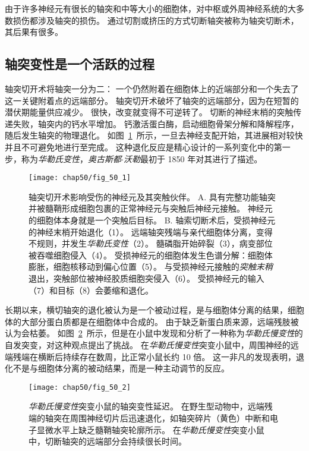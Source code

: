 由于许多神经元有很长的轴突和中等大小的细胞体，对中枢或外周神经系统的大多数损伤都涉及轴突的损伤。
通过切割或挤压的方式切断轴突被称为轴突切断术，其后果有很多。

\subsection{轴突变性是一个活跃的过程}

轴突切开术将轴突一分为二：
一个仍然附着在细胞体上的近端部分和一个失去了这一关键附着点的远端部分。
轴突切开术破坏了轴突的远端部分，因为在短暂的潜伏期能量供应减少。
很快，改变就变得不可逆转了。
切断的神经末梢的突触传递失败，轴突内的钙水平增加。
钙激活蛋白酶，启动细胞骨架分解和降解程序，随后发生轴突的物理退化。
如图~\ref{fig:50_1}~所示，一旦去神经支配开始，其进展相对较快并且不可避免地进行至完成。
这种退化反应是精心设计的一系列变化中的第一步，称为\textit{华勒氏变性}，\textit{奥古斯都$\cdot$沃勒}最初于 1850 年对其进行了描述。


\begin{figure}[htbp]
	\centering
	\texttt{[image: chap50/fig\_50\_1]}
	\caption{轴突切开术影响受伤的神经元及其突触伙伴。
		A. 具有完整功能轴突并被髓鞘形成细胞包裹的正常神经元与突触后神经元接触。
		神经元的细胞体本身就是一个突触后目标。
		B. 轴索切断术后，受损神经元的神经末梢开始退化（1）。
		远端轴突残端与亲代细胞体分离，变得不规则，并发生\textit{华勒氏变性}（2）。
		髓磷脂开始碎裂（3），病变部位被吞噬细胞侵入（4）。
		受损神经元的细胞体发生色谱分解：细胞体膨胀，细胞核移动到偏心位置（5）。
		与受损神经元接触的\textit{突触末稍}退出，突触部位被神经胶质细胞突侵入（6）。
		受损神经元的输入（7）和目标（8）会萎缩和退化。}
	\label{fig:50_1}
\end{figure}


长期以来，横切轴突的退化被认为是一个被动过程，是与细胞体分离的结果，细胞体的大部分蛋白质都是在细胞体中合成的。
由于缺乏新蛋白质来源，远端残肢被认为会枯萎。
如图~\ref{fig:50_2}~所示，但是在小鼠中发现和分析了一种称为\textit{华勒氏慢变性}的自发突变，对这种观点提出了挑战。 
在\textit{华勒氏慢变性}突变小鼠中，周围神经的远端残端在横断后持续存在数周，比正常小鼠长约 10 倍。
这一非凡的发现表明，退化不是与细胞体分离的被动结果，而是一种主动调节的反应。


\begin{figure}[htbp]
	\centering
	\texttt{[image: chap50/fig\_50\_2]}
	\caption{\textit{华勒氏慢变性}突变小鼠的轴突变性延迟。
		在野生型动物中，远端残端的轴突在周围神经切片后迅速退化，如轴突碎片（黄色）中断和电子显微水平上缺乏髓鞘轴突轮廓所示。
		在\textit{华勒氏慢变性}突变小鼠中，切断轴突的远端部分会持续很长时间\cite{beirowski2004quantitative}。}
	\label{fig:50_2}
\end{figure}


